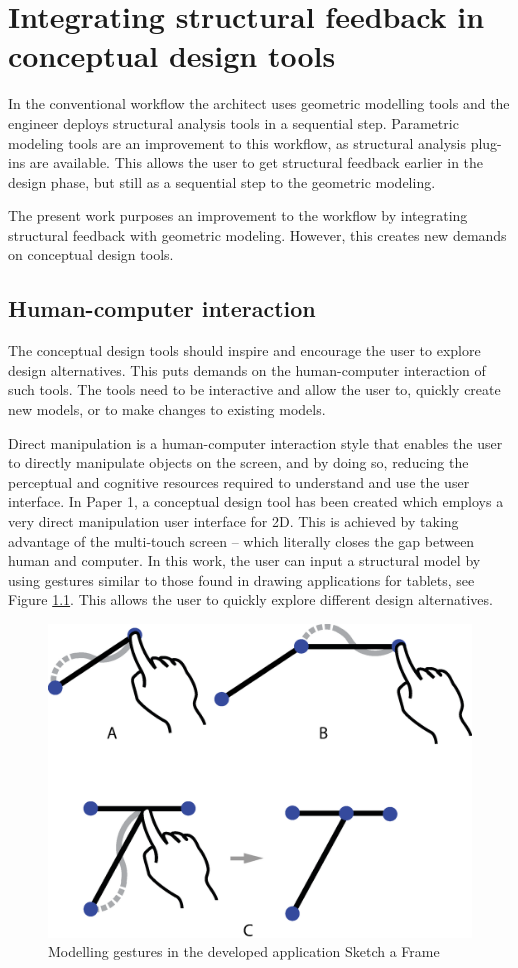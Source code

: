 \chapter{Integrating structural feedback in conceptual design tools}
\label{ch:Integrating structural feedback}
In the conventional workflow the architect uses geometric modelling tools and the engineer deploys structural analysis tools in a sequential step. Parametric modeling tools are an improvement to this workflow, as structural analysis plug-ins are available. This allows the user to get structural feedback earlier in the design phase, but still as a sequential step to the geometric modeling.

The present work purposes an improvement to the workflow by integrating structural feedback with geometric modeling. However, this creates new demands on conceptual design tools. 

\section{Human-computer interaction}
The conceptual design tools should inspire and encourage the user to explore design alternatives. This puts demands on the human-computer interaction of such tools. The tools need to be interactive and allow the user to, quickly create new models, or to make changes to existing models. 

Direct manipulation is a human-computer interaction style that enables the user to directly manipulate objects on the screen, and by doing so, reducing the perceptual and cognitive resources required to understand and use the user interface. In Paper 1, a conceptual design tool has been created which employs a very direct manipulation user interface for 2D. This is achieved by taking advantage of the multi-touch screen – which literally closes the gap between human and computer. In this work, the user can input a structural model by using gestures similar to those found in drawing applications for tablets, see Figure \ref{fig:interaction}. This allows the user to quickly explore different design alternatives.

\begin{figure}
  \includegraphics[width=330pt]{graphics/interaction.eps}
  \caption{Modelling gestures in the developed application Sketch a Frame}
  \label{fig:interaction}
\end{figure}

